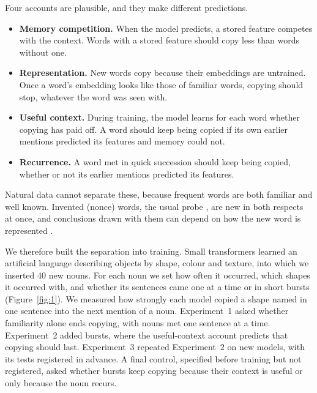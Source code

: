 \documentclass[11pt]{article}
\begin{document}
Four accounts are plausible, and they make different predictions.
\begin{itemize}[leftmargin=*,itemsep=1pt,topsep=2pt]
\item \textbf{Memory competition.} When the model predicts, a stored feature competes with the context. Words with a stored feature should copy less than words without one.
\item \textbf{Representation.} New words copy because their embeddings are untrained. Once a word's embedding looks like those of familiar words, copying should stop, whatever the word was seen with.
\item \textbf{Useful context.} During training, the model learns for each word whether copying has paid off. A word should keep being copied if its own earlier mentions predicted its features and memory could not.
\item \textbf{Recurrence.} A word met in quick succession should keep being copied, whether or not its earlier mentions predicted its features.
\end{itemize}
Natural data cannot separate these, because frequent words are both familiar and well known. Invented (nonce) words, the usual probe \citep{thrush2020,misra2023}, are new in both respects at once, and conclusions drawn with them can depend on how the new word is represented \citep{kim2022lexical}.

We therefore built the separation into training. Small transformers learned an artificial language describing objects by shape, colour and texture, into which we inserted 40 new nouns. For each noun we set how often it occurred, which shapes it occurred with, and whether its sentences came one at a time or in short bursts (Figure~\ref{fig:1}). We measured how strongly each model copied a shape named in one sentence into the next mention of a noun. Experiment~1 asked whether familiarity alone ends copying, with nouns met one sentence at a time. Experiment~2 added bursts, where the useful-context account predicts that copying should last. Experiment~3 repeated Experiment~2 on new models, with its tests registered in advance. A final control, specified before training but not registered, asked whether bursts keep copying because their context is useful or only because the noun recurs.
\end{document}
